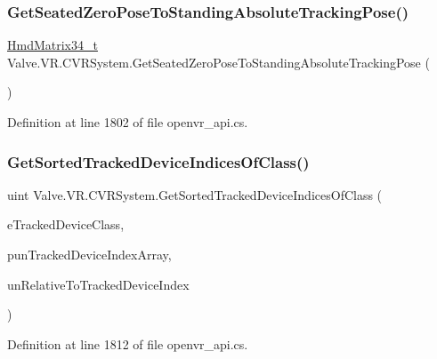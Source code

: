 \subsubsection{\texorpdfstring{GetSeatedZeroPoseToStandingAbsoluteTrackingPose()}{GetSeatedZeroPoseToStandingAbsoluteTrackingPose()}}
{\footnotesize\ttfamily \mbox{\hyperlink{struct_valve_1_1_v_r_1_1_hmd_matrix34__t}{Hmd\+Matrix34\+\_\+t}} Valve.\+V\+R.\+C\+V\+R\+System.\+Get\+Seated\+Zero\+Pose\+To\+Standing\+Absolute\+Tracking\+Pose (\begin{DoxyParamCaption}{ }\end{DoxyParamCaption})}



Definition at line 1802 of file openvr\+\_\+api.\+cs.

\mbox{\label{class_valve_1_1_v_r_1_1_c_v_r_system_a52663d4f2298d80ebbb9e7a81df46dff}} 
\subsubsection{\texorpdfstring{GetSortedTrackedDeviceIndicesOfClass()}{GetSortedTrackedDeviceIndicesOfClass()}}
{\footnotesize\ttfamily uint Valve.\+V\+R.\+C\+V\+R\+System.\+Get\+Sorted\+Tracked\+Device\+Indices\+Of\+Class (\begin{DoxyParamCaption}\item[{\mbox{\hyperlink{namespace_valve_1_1_v_r_aa1a3c2765fe53acb85372a57652c47a1}{E\+Tracked\+Device\+Class}}}]{e\+Tracked\+Device\+Class,  }\item[{uint \mbox{[}$\,$\mbox{]}}]{pun\+Tracked\+Device\+Index\+Array,  }\item[{uint}]{un\+Relative\+To\+Tracked\+Device\+Index }\end{DoxyParamCaption})}



Definition at line 1812 of file openvr\+\_\+api.\+cs.

\mbox{\label{class_valve_1_1_v_r_1_1_c_v_r_system_a7832bc9cd34345dacb66731bc39d8f2a}} 

